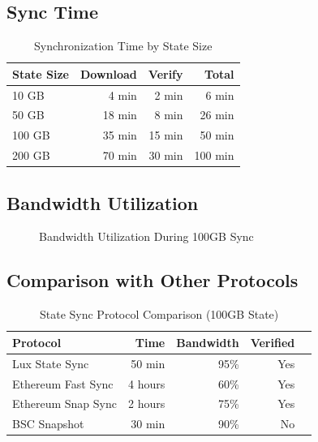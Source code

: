 \documentclass[11pt,a4paper]{article}
\begin{document}
\subsection{Sync Time}

\begin{table}[htbp]
\centering
\caption{Synchronization Time by State Size}
\begin{tabular}{lrrr}
\toprule
\textbf{State Size} & \textbf{Download} & \textbf{Verify} & \textbf{Total} \\
\midrule
10 GB & 4 min & 2 min & 6 min \\
50 GB & 18 min & 8 min & 26 min \\
100 GB & 35 min & 15 min & 50 min \\
200 GB & 70 min & 30 min & 100 min \\
\bottomrule
\end{tabular}
\label{tab:synctime}
\end{table}

\subsection{Bandwidth Utilization}

\begin{figure}[htbp]
\centering
{}
\caption{Bandwidth Utilization During 100GB Sync}
\label{fig:bandwidth}
\end{figure}

\subsection{Comparison with Other Protocols}

\begin{table}[htbp]
\centering
\caption{State Sync Protocol Comparison (100GB State)}
\begin{tabular}{lrrrr}
\toprule
\textbf{Protocol} & \textbf{Time} & \textbf{Bandwidth} & \textbf{Verified} \\
\midrule
Lux State Sync & 50 min & 95\% & Yes \\
Ethereum Fast Sync & 4 hours & 60\% & Yes \\
Ethereum Snap Sync & 2 hours & 75\% & Yes \\
BSC Snapshot & 30 min & 90\% & No \\
\bottomrule
\end{tabular}
\label{tab:comparison}
\end{table}
\end{document}
